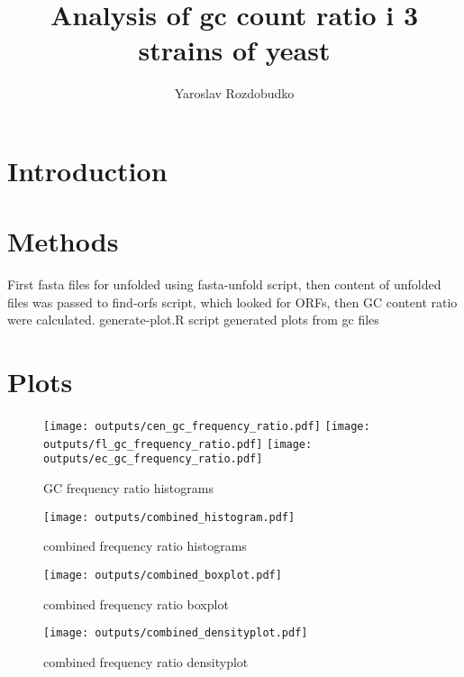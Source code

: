 \documentclass{article}
\title{Analysis of gc count ratio i 3 strains of yeast}
\author{Yaroslav Rozdobudko}
\begin{document}
\maketitle

\section{Introduction}



\section{Methods}

First fasta files for unfolded using fasta-unfold script, then content of unfolded files was passed to find-orfs script,
which looked for ORFs, then GC content ratio were calculated.
generate-plot.R script generated plots from gc files

\section{Plots}

\begin{figure}
    \texttt{[image: outputs/cen\_gc\_frequency\_ratio.pdf]}
    \texttt{[image: outputs/fl\_gc\_frequency\_ratio.pdf]}
    \texttt{[image: outputs/ec\_gc\_frequency\_ratio.pdf]}
    \caption{GC frequency ratio histograms}
\end{figure}

\begin{figure}
    \texttt{[image: outputs/combined\_histogram.pdf]}
    \caption{combined frequency ratio histograms}
\end{figure}

\begin{figure}
    \texttt{[image: outputs/combined\_boxplot.pdf]}
    \caption{combined frequency ratio boxplot}
\end{figure}

\begin{figure}
    \texttt{[image: outputs/combined\_densityplot.pdf]}
    \caption{combined frequency ratio densityplot}
\end{figure}
\end{document}
